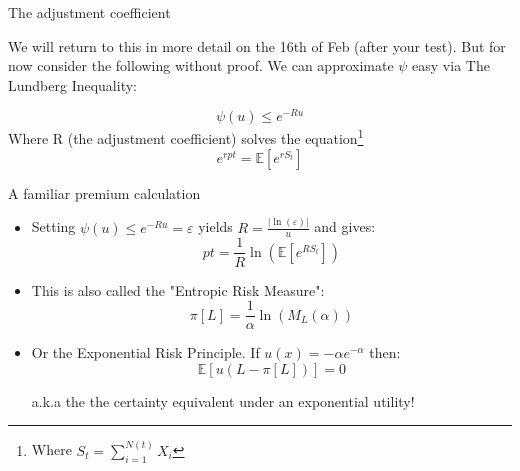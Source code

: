\documentclass[11pt]{beamer}
\newcommand{\expect}{\mathbb{E}}
\begin{document}
\begin{frame}{The adjustment coefficient}

We will return to this in more detail on the 16th of Feb (after your test). But for now consider the following without proof. We can approximate $\psi$ easy via \alert{The Lundberg Inequality}:

\begin{equation*}\label{Def:LI1}
\psi(u) \leq e^{-Ru } 
\end{equation*} 
Where R (the adjustment coefficient) solves the equation\footnote{Where $S_t=\sum_{i=1}^{N(t)} X_i$}
\begin{equation*}\label{Def:NPC}
e^{r p t} = \expect[e^{r S_t }]
\end{equation*} 



\end{frame}
\begin{frame}{A familiar premium calculation}

\begin{itemize}

\item Setting $\psi(u) \leq e^{-Ru } = \varepsilon$ yields $R=\frac{|\ln(\varepsilon)|}{u}$ and gives:
\vspace{- 2mm}
\begin{equation*}
pt=\frac{1}{R} \ln( \expect[e^{R S_t}])
\end{equation*}

\item This is also called the "Entropic Risk Measure":
\vfill
\begin{equation*}
\pi[L]=\frac{1}{\alpha} \ln( M_L(\alpha)  )
\end{equation*}
\vfill
\item Or the Exponential Risk Principle. If $u(x)=-\alpha e^{-\alpha}$ then:
\vfill
\begin{equation*}
\expect[u(L-\pi[L])] = 0
\end{equation*}

a.k.a the the \alert{certainty equivalent} under an exponential utility!

\end{itemize}

\end{frame}
\end{document}
